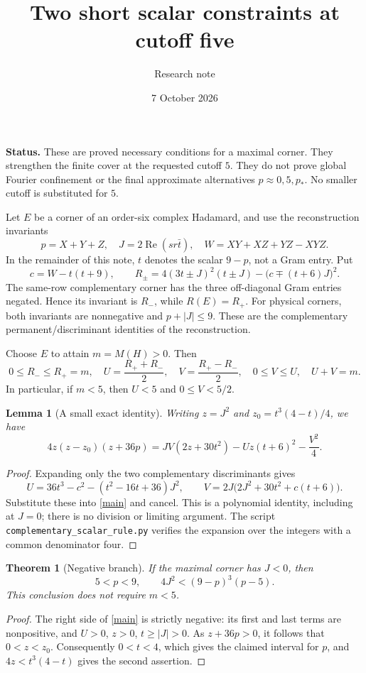 \documentclass[11pt]{article}
\title{Two short scalar constraints at cutoff five}
\author{Research note}\date{7 October 2026}
\newtheorem{theorem}{Theorem}
\newtheorem{lemma}{Lemma}
\begin{document}
\maketitle
\noindent\textbf{Status.} These are proved necessary conditions for a
maximal corner. They strengthen the finite cover at the requested cutoff
$5$. They do not prove global Fourier confinement or the final approximate
alternatives $p\approx0,5,p_*$. No smaller cutoff is substituted for $5$.

Let $E$ be a corner of an order-six complex Hadamard, and use the
reconstruction invariants
\[
 p=X+Y+Z,\quad J=2\operatorname{Re}(sr\bar t),\quad
 W=XY+XZ+YZ-XYZ.
\]
In the remainder of this note, $t$ denotes the scalar $9-p$, not a Gram
entry. Put
\[
 c=W-t(t+9),\qquad
 R_\pm=4(3t\pm J)^2(t\pm J)-\bigl(c\mp(t+6)J\bigr)^2.
\]
The same-row complementary corner has the three off-diagonal Gram entries
negated. Hence its invariant is $R_-$, while $R(E)=R_+$.
For physical corners, both invariants are nonnegative and
$p+|J|\le9$. These are the complementary permanent/discriminant
identities of the reconstruction.

Choose $E$ to attain $m=M(H)>0$. Then
\[
 0\le R_-\le R_+=m,\quad
 U=\frac{R_++R_-}{2},\quad V=\frac{R_+-R_-}{2},\quad
 0\le V\le U,\quad U+V=m.
\]
In particular, if $m<5$, then $U<5$ and $0\le V<5/2$.

\begin{lemma}[A small exact identity]\label{identity}
Writing $z=J^2$ and $z_0=t^3(4-t)/4$, we have
\begin{equation}\label{main}
 4z(z-z_0)(z+36p)
 =JV(2z+30t^2)-Uz(t+6)^2-\frac{V^2}{4}.
\end{equation}
\end{lemma}
\begin{proof}
Expanding only the two complementary discriminants gives
\[
 U=36t^3-c^2-(t^2-16t+36)J^2,\qquad
 V=2J\bigl(2J^2+30t^2+c(t+6)\bigr).
\]
Substitute these into \eqref{main} and cancel. This is a polynomial
identity, including at $J=0$; there is no division or limiting argument.
The script \texttt{complementary\_scalar\_rule.py} verifies the expansion
over the integers with a common denominator four.
\end{proof}

\begin{theorem}[Negative branch]
If the maximal corner has $J<0$, then
\[
 \boxed{\quad 5<p<9,\qquad 4J^2<(9-p)^3(p-5).\quad}
\]
This conclusion does not require $m<5$.
\end{theorem}
\begin{proof}
The right side of \eqref{main} is strictly negative: its first and last
terms are nonpositive, and $U>0$, $z>0$, $t\ge |J|>0$.
As $z+36p>0$, it follows that $0<z<z_0$.
Consequently $0<t<4$, which gives the claimed interval for $p$, and
$4z<t^3(4-t)$ gives the second assertion.
\end{proof}
\end{document}

